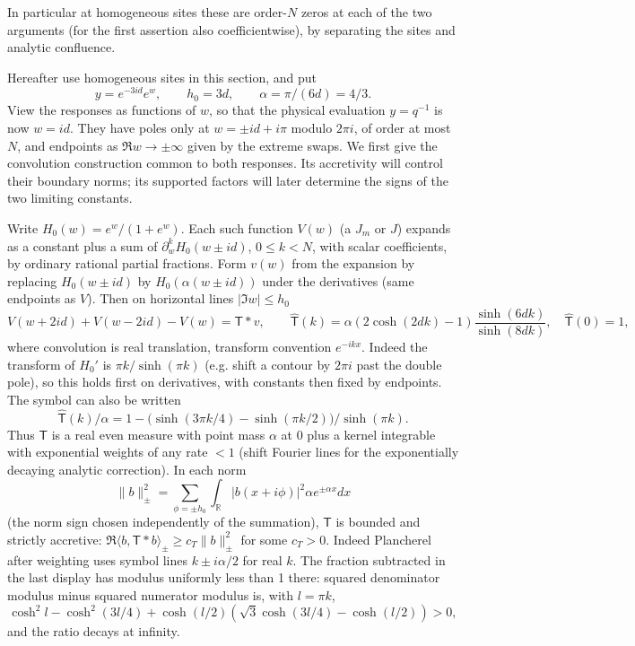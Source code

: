 In particular at homogeneous sites these are order-\(N\) zeros at each of the two arguments (for the first assertion also coefficientwise), by separating the sites and analytic confluence.

Hereafter use homogeneous sites in this section, and put
\[
        y=e^{-3id}e^w,\qquad h_0=3d,\qquad \alpha=\pi/(6d)=4/3 .
\]
View the responses as functions of \(w\), so that the physical evaluation
\(y=q^{-1}\) is now \(w=id\). They have poles only at
\(w=\pm id+i\pi\) modulo \(2\pi i\), of order at most \(N\), and
endpoints as \(\Re w\to\pm\infty\) given by the extreme swaps. We first
give the convolution construction common to both responses. Its
accretivity will control their boundary norms; its supported factors will
later determine the signs of the two limiting constants.

Write \(H_0(w)=e^w/(1+e^w)\). Each such function \(V(w)\) (a \(J_m\) or
\(J\)) expands as a constant plus a sum of
\(\partial_w^k H_0(w\pm id)\), \(0\le k<N\), with scalar coefficients,
by ordinary rational partial fractions. Form \(v(w)\) from the expansion
by replacing \(H_0(w\pm id)\) by \(H_0(\alpha(w\pm id))\) under the
derivatives (same endpoints as \(V\)). Then on horizontal lines
\(|\Im w|\le h_0\)
\begin{equation}
 V(w+2id)+V(w-2id)-V(w)=\mathsf T*v,\qquad
 \widehat{\mathsf T}(k)=\alpha(2\cosh(2dk)-1)\frac{\sinh(6dk)}{\sinh(8dk)},\quad
 \widehat{\mathsf T}(0)=1,                                                 \label{c4:Press-1}
\end{equation}
where convolution is real translation, transform convention \(e^{-ikx}\). Indeed the transform of \(H_0'\) is \(\pi k/\sinh(\pi k)\) (e.g. shift a contour by \(2\pi i\) past the double pole), so this holds first on derivatives, with constants then fixed by endpoints. The symbol can also be written
\[
 \widehat{\mathsf T}(k)/\alpha
       =1-\big(\sinh(3\pi k/4)-\sinh(\pi k/2)\big)/\sinh(\pi k).
\]
Thus \(\mathsf T\) is a real even measure with point mass \(\alpha\) at 0 plus a kernel integrable with exponential weights of any rate \(<1\) (shift Fourier lines for the exponentially decaying analytic correction). In each norm
\[
 \|b\|_\pm^2=\sum_{\phi=\pm h_0}\int_{\mathbb R}|b(x+i\phi)|^2\alpha e^{\pm\alpha x}dx
\]
(the norm sign chosen independently of the summation), \(\mathsf T\) is bounded and strictly accretive: \(\Re\langle b,\mathsf T*b\rangle_\pm\ge c_T\|b\|_\pm^2\) for some \(c_T>0\). Indeed Plancherel after weighting uses symbol lines \(k\pm i\alpha/2\) for real \(k\). The fraction subtracted in the last display has modulus uniformly less than 1 there: squared denominator modulus minus squared numerator modulus is, with \(l=\pi k\),
\[
 \cosh^2 l-\cosh^2(3l/4)+\cosh(l/2)(\sqrt3\cosh(3l/4)-\cosh(l/2))>0,
\]
and the ratio decays at infinity.

